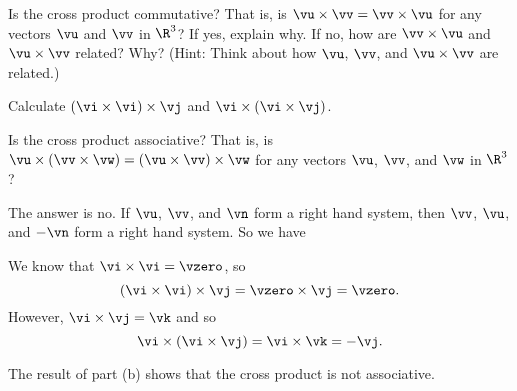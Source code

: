 \begin{activity} \label{A:9.4.2}
\ba
	\item Is the cross product commutative? That is, is $\vu \times \vv = \vv \times \vu$ for any vectors $\vu$ and $\vv$ in $\R^3$? If yes, explain why. If no, how are $\vv \times \vu$ and $\vu \times \vv$ related? Why? (Hint: Think about how $\vu$, $\vv$, and $\vu \times \vv$ are related.)
	
	
	\item Calculate $(\vi \times \vi) \times \vj$ and $\vi \times (\vi \times \vj)$.
	
	
	
	\item Is the cross product associative? That is, is $\vu \times (\vv \times \vw) = (\vu \times \vv) \times \vw$ for any vectors $\vu$, $\vv$, and $\vw$ in $\R^3$?
	
	
	
	\ea
\end{activity}
\begin{smallhint}

\end{smallhint}
\begin{bighint}

\end{bighint}
\begin{activitySolution}
\ba
	\item The answer is no. If $\vu$, $\vv$, and $\vn$ form a right hand system, then $\vv$, $\vu$, and $-\vn$ form a right hand system. So we have
	\item We know that $\vi \times \vi = \vzero$, so 
\[(\vi \times \vi) \times \vj = \vzero \times \vj = \vzero.\]
However, $\vi \times \vj = \vk$ and so 
\[\vi \times (\vi \times \vj) = \vi \times \vk = -\vj.\]
	\item The result of part (b) shows that the cross product is not associative. 	
	\ea
\end{activitySolution}
\aftera
